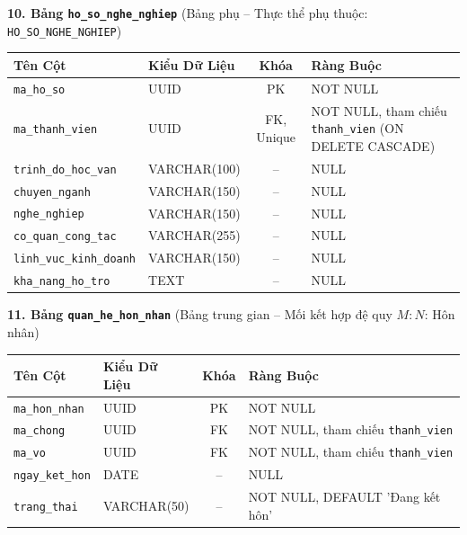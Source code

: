 \noindent\textbf{10. Bảng \texttt{ho\_so\_nghe\_nghiep}} \quad (Bảng phụ -- Thực thể phụ thuộc: \texttt{HO\_SO\_NGHE\_NGHIEP})
\vspace{0.2cm}

\begin{center}
\small
\renewcommand{\arraystretch}{1.2}
\begin{tabular}{|p{3.8cm}|p{2.5cm}|c|p{6.5cm}|}
\hline
\textbf{Tên Cột} & \textbf{Kiểu Dữ Liệu} & \textbf{Khóa} & \textbf{Ràng Buộc} \\ \hline
\texttt{ma\_ho\_so} & UUID & PK & NOT NULL \\ \hline
\texttt{ma\_thanh\_vien} & UUID & FK, Unique & NOT NULL, tham chiếu \texttt{thanh\_vien} (ON DELETE CASCADE) \\ \hline
\texttt{trinh\_do\_hoc\_van} & VARCHAR(100) & -- & NULL \\ \hline
\texttt{chuyen\_nganh} & VARCHAR(150) & -- & NULL \\ \hline
\texttt{nghe\_nghiep} & VARCHAR(150) & -- & NULL \\ \hline
\texttt{co\_quan\_cong\_tac} & VARCHAR(255) & -- & NULL \\ \hline
\texttt{linh\_vuc\_kinh\_doanh} & VARCHAR(150) & -- & NULL \\ \hline
\texttt{kha\_nang\_ho\_tro} & TEXT & -- & NULL \\ \hline
\end{tabular}
\end{center}
\vspace{0.3cm}

\noindent\textbf{11. Bảng \texttt{quan\_he\_hon\_nhan}} \quad (Bảng trung gian -- Mối kết hợp đệ quy $M{:}N$: Hôn nhân)
\vspace{0.2cm}

\begin{center}
\small
\renewcommand{\arraystretch}{1.2}
\begin{tabular}{|p{3.8cm}|p{2.5cm}|c|p{6.5cm}|}
\hline
\textbf{Tên Cột} & \textbf{Kiểu Dữ Liệu} & \textbf{Khóa} & \textbf{Ràng Buộc} \\ \hline
\texttt{ma\_hon\_nhan} & UUID & PK & NOT NULL \\ \hline
\texttt{ma\_chong} & UUID & FK & NOT NULL, tham chiếu \texttt{thanh\_vien} \\ \hline
\texttt{ma\_vo} & UUID & FK & NOT NULL, tham chiếu \texttt{thanh\_vien} \\ \hline
\texttt{ngay\_ket\_hon} & DATE & -- & NULL \\ \hline
\texttt{trang\_thai} & VARCHAR(50) & -- & NOT NULL, DEFAULT 'Đang kết hôn' \\ \hline
\end{tabular}
\end{center}
\vspace{0.3cm}

